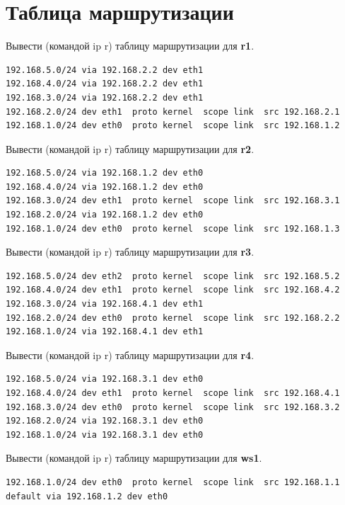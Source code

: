 \documentclass[a4paper,12pt]{article}
\begin{document}
\section{Таблица маршрутизации}

Вывести (командой ip r) таблицу маршрутизации для \textbf{r1}.

\begin{Verbatim}
192.168.5.0/24 via 192.168.2.2 dev eth1 
192.168.4.0/24 via 192.168.2.2 dev eth1 
192.168.3.0/24 via 192.168.2.2 dev eth1 
192.168.2.0/24 dev eth1  proto kernel  scope link  src 192.168.2.1 
192.168.1.0/24 dev eth0  proto kernel  scope link  src 192.168.1.2 
\end{Verbatim}

Вывести (командой ip r) таблицу маршрутизации для \textbf{r2}.

\begin{Verbatim}
192.168.5.0/24 via 192.168.1.2 dev eth0 
192.168.4.0/24 via 192.168.1.2 dev eth0 
192.168.3.0/24 dev eth1  proto kernel  scope link  src 192.168.3.1 
192.168.2.0/24 via 192.168.1.2 dev eth0 
192.168.1.0/24 dev eth0  proto kernel  scope link  src 192.168.1.3 
\end{Verbatim}

Вывести (командой ip r) таблицу маршрутизации для \textbf{r3}.

\begin{Verbatim}
192.168.5.0/24 dev eth2  proto kernel  scope link  src 192.168.5.2 
192.168.4.0/24 dev eth1  proto kernel  scope link  src 192.168.4.2 
192.168.3.0/24 via 192.168.4.1 dev eth1 
192.168.2.0/24 dev eth0  proto kernel  scope link  src 192.168.2.2 
192.168.1.0/24 via 192.168.4.1 dev eth1 
\end{Verbatim}

Вывести (командой ip r) таблицу маршрутизации для \textbf{r4}.

\begin{Verbatim}
192.168.5.0/24 via 192.168.3.1 dev eth0 
192.168.4.0/24 dev eth1  proto kernel  scope link  src 192.168.4.1 
192.168.3.0/24 dev eth0  proto kernel  scope link  src 192.168.3.2 
192.168.2.0/24 via 192.168.3.1 dev eth0 
192.168.1.0/24 via 192.168.3.1 dev eth0 
\end{Verbatim}

Вывести (командой ip r) таблицу маршрутизации для \textbf{ws1}.

\begin{Verbatim}
192.168.1.0/24 dev eth0  proto kernel  scope link  src 192.168.1.1 
default via 192.168.1.2 dev eth0  
\end{Verbatim}
\end{document}
